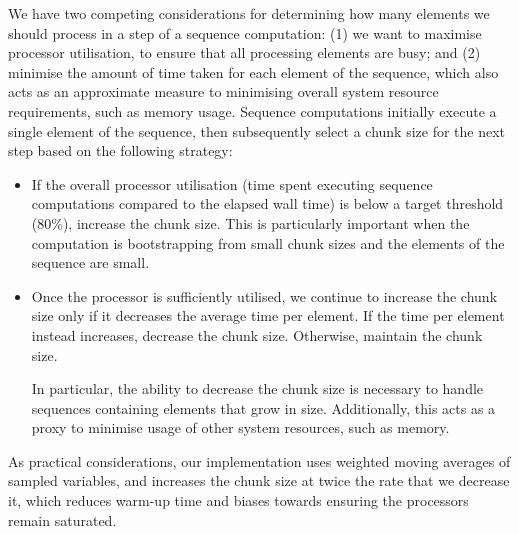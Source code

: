 We have two competing considerations for determining how many elements we should
process in a step of a sequence computation: (1) we want to maximise processor
utilisation, to ensure that all processing elements are busy; and (2) minimise
the amount of time taken for each element of the sequence, which also acts as an
approximate measure to minimising overall system resource requirements, such as
memory usage. Sequence computations initially execute a single element of the
sequence, then subsequently select a chunk size for the next step based on the
following strategy:
%
\begin{itemize}
  \item If the overall processor utilisation (time spent executing sequence computations compared to the elapsed wall time) is below a target threshold
    (80\%), increase the chunk size.
    This is particularly important when the computation is bootstrapping from
    small chunk sizes and the elements of the sequence are small.

  \item Once the processor is sufficiently utilised, we continue to increase the chunk size only if it decreases the average time per element. If the time per element instead increases, decrease the chunk size. Otherwise, maintain the chunk size.

  In particular, the ability to decrease the chunk size is necessary to handle sequences containing elements that grow in size. Additionally, this acts as a proxy to minimise usage of other system resources, such as memory.


\end{itemize}
%
As practical considerations, our implementation uses weighted moving averages of
sampled variables, and increases the chunk size at twice the rate that we
decrease it, which reduces warm-up time and biases towards ensuring the
processors remain saturated.

\endinput



